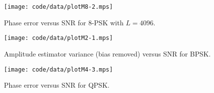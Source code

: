 \documentclass[journal]{IEEEtran}
\begin{document}
\begin{figure}[p]
	\centering
		\texttt{[image: code/data/plotM8-2.mps]}
		\caption{Phase error versus SNR for $8$-PSK with $L=4096$.}
		\label{fig:plotphase8PSK}
\end{figure}



\begin{figure}[tp]
	\centering
		\texttt{[image: code/data/plotM2-1.mps]}
		\caption{Amplitude estimator variance (bias removed) versus SNR for BPSK.}
		\label{fig:plotampBPSK}
\end{figure}




\begin{figure}[tp]
	\centering
		\texttt{[image: code/data/plotM4-3.mps]}
		\caption{Phase error versus SNR for QPSK.}
		\label{fig:plotphaseQPSKmultL}
\end{figure}


\end{document}

